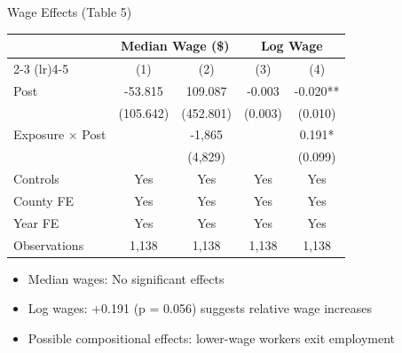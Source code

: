 \documentclass[aspectratio=169]{beamer}
\begin{document}
\begin{frame}{Wage Effects (Table 5)}
  \begin{table}
  \tiny
  \centering
  \begin{tabular}{lcccc}
  \toprule
  & \multicolumn{2}{c}{Median Wage (\$)} & \multicolumn{2}{c}{Log Wage} \\
  \cmidrule(lr){2-3} \cmidrule(lr){4-5}
  & (1) & (2) & (3) & (4) \\
  \midrule
  Post & -53.815 & 109.087 & -0.003 & -0.020** \\
  & (105.642) & (452.801) & (0.003) & (0.010) \\
  Exposure $\times$ Post & & -1,865 & & 0.191* \\
  & & (4,829) & & (0.099) \\
  \midrule
  Controls & Yes & Yes & Yes & Yes \\
  County FE & Yes & Yes & Yes & Yes \\
  Year FE & Yes & Yes & Yes & Yes \\
  Observations & 1,138 & 1,138 & 1,138 & 1,138 \\
  \bottomrule
  \end{tabular}
  \end{table}
  \vspace{0.2cm}
  \begin{itemize}
    \item Median wages: No significant effects
    \item Log wages: +0.191 (p = 0.056) suggests relative wage increases
    \item Possible compositional effects: lower-wage workers exit employment
  \end{itemize}
\end{frame}
\end{document}

